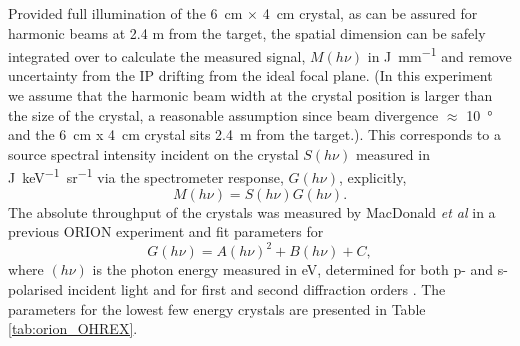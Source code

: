 Provided full illumination of the \qty{6}{cm} $\times$ \qty{4}{cm} crystal, as can be assured for harmonic beams at 2.4 m from the target, the spatial dimension can be safely integrated over to calculate the measured signal, $M(h\nu)$ in \unit{J.mm^{-1}} and remove uncertainty from the IP drifting from the ideal focal plane. (In this experiment we assume that the harmonic beam width at the crystal position is larger than the size of the crystal, a reasonable assumption since beam divergence $\approx$ \qty{10}{\degree} and the \qty{6}{cm} x \qty{4}{cm} crystal sits \qty{2.4}{m} from the target.). This corresponds to a source spectral intensity incident on the crystal $S(h\nu)$ measured in \unit{J.keV^{-1}.sr^{-1}} via the spectrometer response, $G(h\nu)$, explicitly,
\begin{equation}
	M(h\nu) = S(h\nu)G(h\nu).
\end{equation}
The absolute throughput of the crystals was measured by MacDonald \textit{et al} in a previous ORION experiment and fit parameters for 
\begin{equation}
	G(h\nu) = A(h\nu)^2 + B(h\nu) + C,
\end{equation}
where $(h\nu)$ is the photon energy measured in eV, determined for both p- and s-polarised incident light and for first and second diffraction orders \cite{macdonaldAbsoluteThroughputCalibration2021}. The parameters for the lowest few energy crystals are presented in Table \ref{tab:orion_OHREX}.
